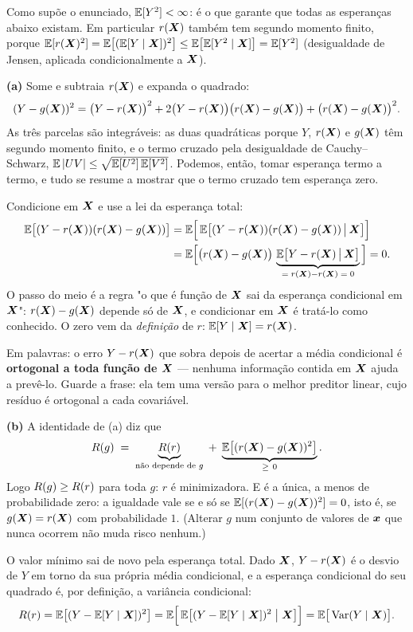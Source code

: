 \begin{solucao}
Como supõe o enunciado, $\mathbb{E}[Y^2]<\infty$: é o que garante que todas as esperanças
abaixo existam. Em particular $r(\bm{X})$ também tem segundo momento
finito, porque $\mathbb{E}[r(\bm{X})^2]=\mathbb{E}\big[(\mathbb{E}[Y\mid\bm{X}])^2\big]\le\mathbb{E}\big[\mathbb{E}[Y^2\mid\bm{X}]\big]=\mathbb{E}[Y^2]$
(desigualdade de Jensen, aplicada condicionalmente a $\bm{X}$).

\smallskip
\textbf{(a)} Some e subtraia $r(\bm{X})$ e expanda o quadrado:
\[
  (Y-g(\bm{X}))^2 = \big(Y-r(\bm{X})\big)^2
     + 2\big(Y-r(\bm{X})\big)\big(r(\bm{X})-g(\bm{X})\big)
     + \big(r(\bm{X})-g(\bm{X})\big)^2 .
\]
As três parcelas são integráveis: as duas quadráticas porque $Y$, $r(\bm{X})$ e $g(\bm{X})$
têm segundo momento finito, e o termo cruzado pela desigualdade de Cauchy--Schwarz,
$\mathbb{E}\left\lvert UV \right\rvert\le\sqrt{\mathbb{E}[U^2]\,\mathbb{E}[V^2]}$. Podemos, então, tomar esperança termo a
termo, e tudo se resume a mostrar que o termo cruzado tem esperança zero.

Condicione em $\bm{X}$ e use a lei da esperança total:
\[
\begin{aligned}
  \mathbb{E}\big[(Y-r(\bm{X}))(r(\bm{X})-g(\bm{X}))\big]
  &= \mathbb{E}\Big[\,\mathbb{E}\big[(Y-r(\bm{X}))(r(\bm{X})-g(\bm{X}))\,\big|\,\bm{X}\big]\Big]\\
  &= \mathbb{E}\Big[\big(r(\bm{X})-g(\bm{X})\big)\,
       \underbrace{\mathbb{E}\big[Y-r(\bm{X})\,\big|\,\bm{X}\big]}_{=\;r(\bm{X})-r(\bm{X})\;=\;0}\Big]
  = 0 .
\end{aligned}
\]
O passo do meio é a regra "o que é função de $\bm{X}$ sai da esperança condicional em
$\bm{X}$": $r(\bm{X})-g(\bm{X})$ depende só de $\bm{X}$, e condicionar em $\bm{X}$ é tratá-lo como
conhecido. O zero vem da \emph{definição} de $r$: $\mathbb{E}[Y\mid\bm{X}]=r(\bm{X})$.

Em palavras: o erro $Y-r(\bm{X})$ que sobra depois de acertar a média condicional é
\textbf{ortogonal a toda função de $\bm{X}$} --- nenhuma informação contida em $\bm{X}$ ajuda a
prevê-lo. Guarde a frase: ela tem uma versão para o melhor preditor linear, cujo
resíduo é ortogonal a cada covariável.

\smallskip
\textbf{(b)} A identidade de (a) diz que
\[
  R(g) \;=\; \underbrace{R(r)}_{\text{não depende de } g}
   \;+\; \underbrace{\mathbb{E}\big[(r(\bm{X})-g(\bm{X}))^2\big]}_{\ge\ 0} .
\]
Logo $R(g)\ge R(r)$ para toda $g$: $r$ é minimizadora. E é a única, a menos
de probabilidade zero: a igualdade vale se e só se $\mathbb{E}[(r(\bm{X})-g(\bm{X}))^2]=0$, isto é,
se $g(\bm{X})=r(\bm{X})$ com probabilidade $1$. (Alterar $g$ num conjunto de valores de $\bm{x}$
que nunca ocorrem não muda risco nenhum.)

O valor mínimo sai de novo pela esperança total. Dado $\bm{X}$, $Y-r(\bm{X})$ é o desvio de
$Y$ em torno da sua própria média condicional, e a esperança condicional do seu
quadrado é, por definição, a variância condicional:
\[
  R(r)=\mathbb{E}\big[(Y-\mathbb{E}[Y\mid\bm{X}])^2\big]
   =\mathbb{E}\Big[\,\mathbb{E}\big[(Y-\mathbb{E}[Y\mid\bm{X}])^2\;\big|\;\bm{X}\big]\Big]
   =\mathbb{E}\big[\operatorname{Var}(Y\mid\bm{X})\big].
\]


\end{solucao}
